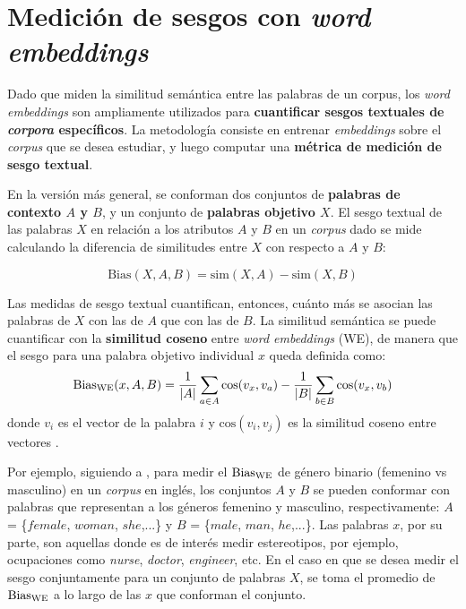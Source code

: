 \section{Medición de sesgos con \emph{word embeddings}} \label{sec:bias_we}

Dado que miden la similitud semántica entre las palabras de un corpus, los \emph{word embeddings} son ampliamente utilizados para \textbf{cuantificar sesgos textuales de \emph{corpora} específicos}. La metodología consiste en entrenar \emph{embeddings} sobre el \emph{corpus} que se desea estudiar, y luego computar una \textbf{métrica de medición de sesgo textual}.

En la versión más general, se conforman dos conjuntos de \textbf{palabras de contexto $A$ y $B$}, y un conjunto de \textbf{palabras objetivo $X$}. El sesgo textual de las palabras $X$ en relación a los atributos $A$ y $B$ en un \emph{corpus} dado se mide calculando la diferencia de similitudes entre $X$ con respecto a $A$ y $B$:

\begin{equation} \label{eq:bias}
    \text{Bias}(X,A,B) = \text{sim}(X,A) - \text{sim}(X,B)
\end{equation}

Las medidas de sesgo textual cuantifican, entonces, cuánto más se asocian las palabras de $X$ con las de $A$ que con las de $B$. La similitud semántica se puede cuantificar con la \textbf{similitud coseno} entre \emph{word embeddings} (WE), de manera que el sesgo para una palabra objetivo individual $x$ queda definida como:
%
\begin{equation} \label{eq:bias_we}
    \operatorname{Bias_{WE}}(x,A,B) =
    \frac{1}{|A|} \sum_{a \in A} \text{cos}(v_x,v_a) -
    \frac{1}{|B|} \sum_{b \in B} \text{cos}(v_x,v_b)
\end{equation}
%
donde $v_i$ es el vector de la palabra $i$ y $\text{cos}(v_i,v_j)$ es la similitud coseno entre vectores \citep{lewis2020gender}.

Por ejemplo, siguiendo a \citet{lewis2020gender}, para medir el $\operatorname{Bias_{WE}}$ de género binario (femenino vs masculino) en un \emph{corpus} en inglés, los conjuntos $A$ y $B$ se pueden conformar con palabras que representan a los géneros femenino y masculino, respectivamente: $A$ = \{$female$, $woman$, $she$,...\} y $B$ = \{$male$, $man$, $he$,...\}. Las palabras $x$, por su parte, son aquellas donde es de interés medir estereotipos, por ejemplo, ocupaciones como \emph{nurse}, \emph{doctor}, \emph{engineer}, etc. En el caso en que se desea medir el sesgo conjuntamente para un conjunto de palabras $X$, se toma el promedio de $\operatorname{Bias_{WE}}$ a lo largo de las $x$ que conforman el conjunto. 

